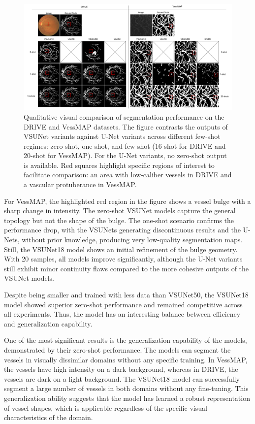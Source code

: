 \documentclass[%
reprint,
nofootinbib,
 amsmath,amssymb,
aps,
superscriptaddress,
showkeys,
longbibliography
]{revtex4-1}
\begin{document}
\begin{figure}[tbp]
    \centering
    \includegraphics[width=\textwidth]{figures/results/results_fewshots.pdf}
    \caption{Qualitative visual comparison of segmentation performance on the DRIVE and VessMAP datasets. The figure contrasts the outputs of VSUNet variants against U-Net variants across different few-shot regimes: zero-shot, one-shot, and few-shot (16-shot for DRIVE and 20-shot for VessMAP). For the U-Net variants, no zero-shot output is available. Red squares highlight specific regions of interest to facilitate comparison: an area with low-caliber vessels in DRIVE and a vascular protuberance in VessMAP.}
    \label{f:results_fewshots_drive}
\end{figure}

For VessMAP, the highlighted red region in the figure shows a vessel bulge with a sharp change in intensity. The zero-shot VSUNet models capture the general topology but not the shape of the bulge. The one-shot scenario confirms the performance drop, with the VSUNets generating discontinuous results and the U-Nets, without prior knowledge, producing very low-quality segmentation maps. Still, the VSUNet18 model shows an initial refinement of the bulge geometry. With 20 samples, all models improve significantly, although the U-Net variants still exhibit minor continuity flaws compared to the more cohesive outputs of the VSUNet models.

Despite being smaller and trained with less data than VSUNet50, the VSUNet18 model showed superior zero-shot performance and remained competitive across all experiments. Thus, the model has an interesting balance between efficiency and generalization capability.

One of the most significant results is the generalization capability of the models, demonstrated by their zero-shot performance. The models can segment the vessels in visually dissimilar domains without any specific training. In VessMAP, the vessels have high intensity on a dark background, whereas in DRIVE, the vessels are dark on a light background. The VSUNet18 model can successfully segment a large number of vessels in both domains without any fine-tuning. This generalization ability suggests that the model has learned a robust representation of vessel shapes, which is applicable regardless of the specific visual characteristics of the domain.
\end{document}
